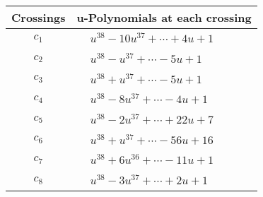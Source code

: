 \documentclass[1p]{elsarticle_modified}
\theoremstyle{definition}
\begin{document}
\begin{tabular}{m{50pt}|m{274pt}}
Crossings & \hspace{64pt}u-Polynomials at each crossing \\
\hline $$\begin{aligned}c_{1}\end{aligned}$$&$\begin{aligned}
&u^{38}-10 u^{37}+\cdots+4 u+1
\end{aligned}$\\
\hline $$\begin{aligned}c_{2}\end{aligned}$$&$\begin{aligned}
&u^{38}- u^{37}+\cdots-5 u+1
\end{aligned}$\\
\hline $$\begin{aligned}c_{3}\end{aligned}$$&$\begin{aligned}
&u^{38}+u^{37}+\cdots-5 u+1
\end{aligned}$\\
\hline $$\begin{aligned}c_{4}\end{aligned}$$&$\begin{aligned}
&u^{38}-8 u^{37}+\cdots-4 u+1
\end{aligned}$\\
\hline $$\begin{aligned}c_{5}\end{aligned}$$&$\begin{aligned}
&u^{38}-2 u^{37}+\cdots+22 u+7
\end{aligned}$\\
\hline $$\begin{aligned}c_{6}\end{aligned}$$&$\begin{aligned}
&u^{38}+u^{37}+\cdots-56 u+16
\end{aligned}$\\
\hline $$\begin{aligned}c_{7}\end{aligned}$$&$\begin{aligned}
&u^{38}+6 u^{36}+\cdots-11 u+1
\end{aligned}$\\
\hline $$\begin{aligned}c_{8}\end{aligned}$$&$\begin{aligned}
&u^{38}-3 u^{37}+\cdots+2 u+1
\end{aligned}$\\

\end{tabular}
\end{document}
